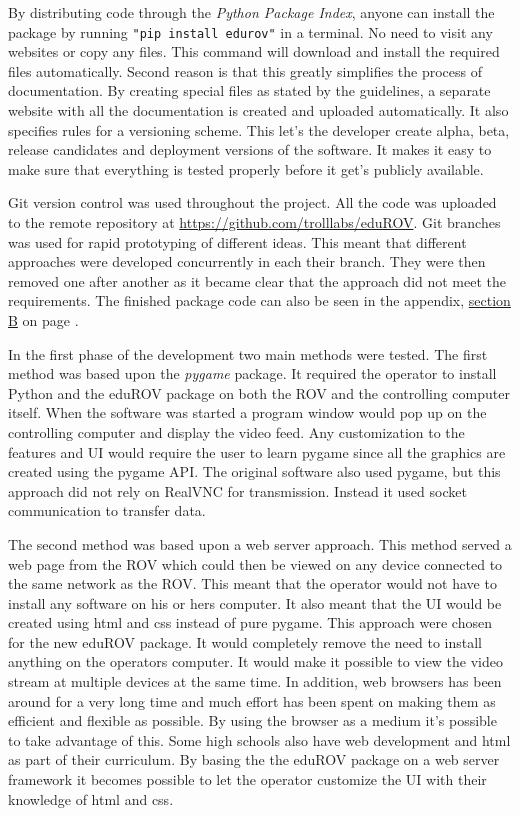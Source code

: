 By distributing code through the \emph{Python Package Index}, anyone can install the package by running \texttt{"pip install edurov"} in a terminal. No need to visit any websites or copy any files. This command will download and install the required files automatically. Second reason is that this greatly simplifies the process of documentation. By creating special files as stated by the guidelines, a separate website with all the documentation is created and uploaded automatically. It also specifies rules for a versioning scheme. This let's the developer create alpha, beta, release candidates and deployment versions of the software. It makes it easy to make sure that everything is tested properly before it get's publicly available.

Git version control was used throughout the project. All the code was uploaded to the remote repository at \url{https://github.com/trolllabs/eduROV}. Git branches was used for rapid prototyping of different ideas. This meant that different approaches were developed concurrently in each their branch. They were then removed one after another as it became clear that the approach did not meet the requirements. The finished package code can also be seen in the appendix, \hyperref[appCode]{section B} on page \pageref{appCode}.

In the first phase of the development two main methods were tested. The first method was based upon the \emph{pygame} package. It required the operator to install Python and the eduROV package on both the ROV and the controlling computer itself. When the software was started a program window would pop up on the controlling computer and display the video feed. Any customization to the features and UI would require the user to learn pygame since all the graphics are created using the pygame API. The original software also used pygame, but this approach did not rely on RealVNC for transmission. Instead it used socket communication to transfer data.

The second method was based upon a web server approach. This method served a web page from the ROV which could then be viewed on any device connected to the same network as the ROV. This meant that the operator would not have to install any software on his or hers computer. It also meant that the UI would be created using html and css instead of pure pygame. This approach were chosen for the new eduROV package. It would completely remove the need to install anything on the operators computer. It would make it possible to view the video stream at multiple devices at the same time. In addition, web browsers has been around for a very long time and much effort has been spent on making them as efficient and flexible as possible. By using the browser as a medium it's possible to take advantage of this. Some high schools also have web development and html as part of their curriculum. By basing the the eduROV package on a web server framework it becomes possible to let the operator customize the UI with their knowledge of html and css.


